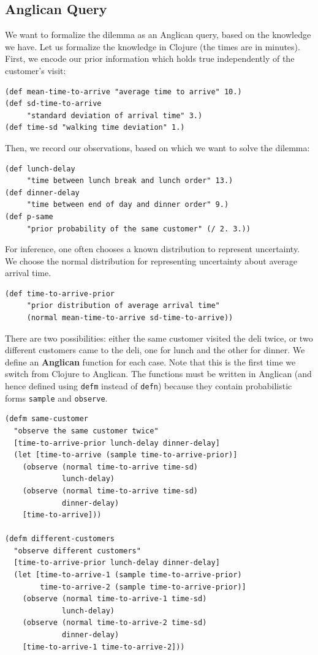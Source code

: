 \documentclass[sigconf]{acmart}
\begin{document}
\subsection{Anglican Query}
\label{seq:deli-query}

We want to formalize the dilemma as an Anglican query, based on
the knowledge we have. Let us formalize the knowledge in
Clojure (the times are in minutes). First, we encode our prior
information which holds true independently of the customer's
visit:

\begin{lstlisting}[style=default]
(def mean-time-to-arrive "average time to arrive" 10.)
(def sd-time-to-arrive
     "standard deviation of arrival time" 3.)
(def time-sd "walking time deviation" 1.)
\end{lstlisting}

Then, we record our observations, based on which we want to
solve the dilemma:

\begin{lstlisting}[style=default]
(def lunch-delay
     "time between lunch break and lunch order" 13.)
(def dinner-delay
     "time between end of day and dinner order" 9.)
(def p-same
     "prior probability of the same customer" (/ 2. 3.))
\end{lstlisting}


For inference, one often chooses a known distribution to
represent uncertainty. We choose the normal
distribution for representing uncertainty about average arrival
time.

\begin{lstlisting}[style=default]
(def time-to-arrive-prior 
     "prior distribution of average arrival time"
     (normal mean-time-to-arrive sd-time-to-arrive))
\end{lstlisting}

There are two possibilities: either the same customer visited
the deli twice, or two different customers came to the deli,
one for lunch and the other for dinner. We define an \textbf{Anglican} function
for each case. Note that this is the first time we switch from
Clojure to Anglican. The functions must be written in Anglican
(and hence defined using \texttt{defm} instead of \texttt{defn})
because they contain probabilistic forms \texttt{sample} and
\texttt{observe}.

\begin{lstlisting}[style=default]
(defm same-customer 
  "observe the same customer twice"
  [time-to-arrive-prior lunch-delay dinner-delay]
  (let [time-to-arrive (sample time-to-arrive-prior)]
    (observe (normal time-to-arrive time-sd)
             lunch-delay)
    (observe (normal time-to-arrive time-sd)
             dinner-delay)
    [time-to-arrive]))

(defm different-customers
  "observe different customers"
  [time-to-arrive-prior lunch-delay dinner-delay]
  (let [time-to-arrive-1 (sample time-to-arrive-prior)
        time-to-arrive-2 (sample time-to-arrive-prior)]
    (observe (normal time-to-arrive-1 time-sd)
             lunch-delay)
    (observe (normal time-to-arrive-2 time-sd)
             dinner-delay)
    [time-to-arrive-1 time-to-arrive-2]))
\end{lstlisting}
\end{document}
